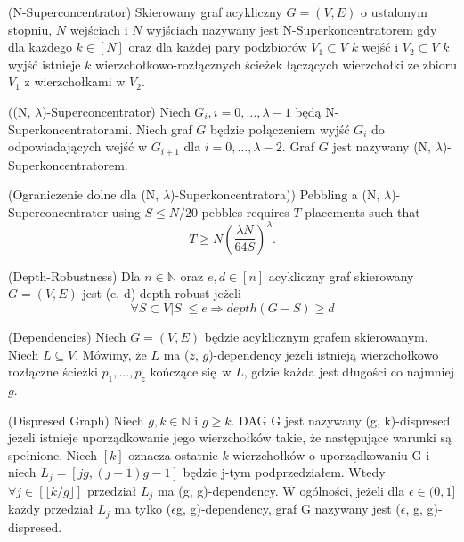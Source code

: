\begin{definition}
	(N-Superconcentrator) Skierowany graf acykliczny $G = (V, E)$ o ustalonym stopniu, $N$ wejściach i
	$N$ wyjściach nazywany jest N-Superkoncentratorem gdy dla każdego $k \in [N]$
	oraz dla każdej pary podzbiorów $V_{1} \subset V$ $k$ wejść i $V_{2} \subset V$ $k$ wyjść istnieje
	$k$ wierzchołkowo-rozłącznych ścieżek łączących wierzchołki ze zbioru $V_{1}$ z wierzchołkami w $V_{2}$.
\end{definition}

\begin{definition}
	((N, $\lambda$)-Superconcentrator) Niech $G_{i}, i = 0, \dots, \lambda-1$ będą N-Superkoncentratorami.
	Niech graf $G$ będzie połączeniem wyjść $G_{i}$ do odpowiadających wejść w $G_{i+1}$ dla $i = 0, \dots, \lambda - 2$.
	Graf $G$ jest nazywany (N, $\lambda$)-Superkoncentratorem.
\end{definition}

\begin{theorem}
	(Ograniczenie dolne dla (N, $ \lambda $)-Superkoncentratora))
	Pebbling a (N, $ \lambda $)-Superconcentrator using $S \leq N/ 20 $	pebbles requires $T$ placements such that
	$$ T \geq N \left( \frac{ \lambda N}{64 S} \right) ^{ \lambda }.$$
\end{theorem}

\begin{definition}
	(Depth-Robustness) Dla $n \in \mathbb{N}$ oraz $e, d \in [n]$ acykliczny graf skierowany $G = (V, E)$
	jest (e, d)-depth-robust jeżeli
	$$ \forall S \subset V | S | \leq e \Rightarrow depth(G - S) \geq d$$
\end{definition}


\begin{definition}
	(Dependencies) Niech $G = (V, E)$ będzie acyklicznym grafem skierowanym.
	Niech $L \subseteq V$.
	Mówimy, że $L$ ma ($z$, $g$)-dependency jeżeli istnieją wierzchołkowo rozłączne ścieżki $p_{1}, \dots , p_{z}$ kończące się w $L$, gdzie każda jest długości co najmniej $g$.
\end{definition}

\begin{definition}
	(Dispresed Graph) Niech $g, k \in \mathbb{N}$ i $g \geq k$. DAG G jest nazywany (g, k)-dispresed jeżeli istnieje uporządkowanie jego wierzchołków takie, że następujące warunki są spełnione.
	Niech $[k]$ oznacza ostatnie $k$ wierzchołków o uporządkowaniu G i niech $L_{j} = [jg, (j + 1)g - 1]$ będzie j-tym podprzedziałem.
	Wtedy $\forall j \in [ \lfloor k / g \rfloor ]$ przedział $L_{j}$ ma (g, g)-dependency.
	W ogólności, jeżeli dla $ \epsilon \in (0, 1] $ każdy przedział $L_{j}$ ma tylko ($\epsilon$g, g)-dependency, graf G nazywany jest ($\epsilon$, g, g)-dispresed.
\end{definition}



